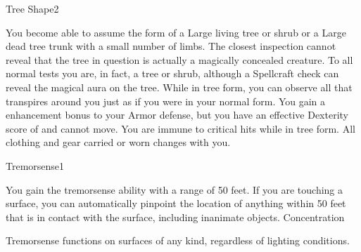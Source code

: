 \begin{spellsection}{Tree Shape}{2}
\begin{spellheader}
    \begin{spelltargetinginfo}
    \end{spelltargetinginfo}
\end{spellheader}
\begin{spellcontent}
    \begin{spelleffects}
        \spelleffect You become able to assume the form of a Large living tree or shrub or a Large dead tree trunk with a small number of limbs. The closest inspection cannot reveal that the tree in question is actually a magically concealed creature. To all normal tests you are, in fact, a tree or shrub, although a Spellcraft check can reveal the magical aura on the tree. While in tree form, you can observe all that transpires around you just as if you were in your normal form. You gain a  enhancement bonus to your Armor defense, but you have an effective Dexterity score of  and cannot move. You are immune to critical hits while in tree form. All clothing and gear carried or worn changes with you.
        \spelldur \durext \dismissable
    \end{spelleffects}
\end{spellcontent}
\begin{spellfooter}
\end{spellfooter}
\end{spellsection}

\begin{spellsection}{Tremorsense}{1}
\begin{spellheader}
    \begin{spelltargetinginfo}
    \end{spelltargetinginfo}
\end{spellheader}
\begin{spellcontent}
    \begin{spelleffects}
        \spelleffect You gain the tremorsense ability with a range of 50 feet. If you are touching a surface, you can automatically pinpoint the location of anything within 50 feet that is in contact with the surface, including inanimate objects.
        \spelldur Concentration
    \end{spelleffects}
\end{spellcontent}
\begin{spellfooter}
    \spellnotes Tremorsense functions on surfaces of any kind, regardless of lighting conditions.
\end{spellfooter}
\end{spellsection}

